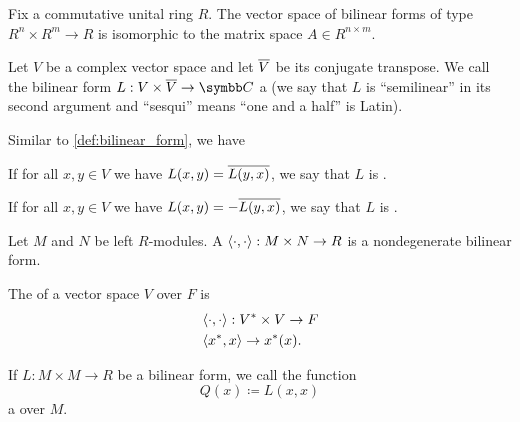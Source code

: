 \begin{corollary}\label{thm:bilinear_forms_isomorphic_to_matrices}
  Fix a commutative unital ring \( R \). The vector space of bilinear forms of type \( R^n \times R^m \to R \) is isomorphic to the matrix space \( A \in R^{n \times m} \).
\end{corollary}

\begin{definition}\label{def:sesquilinear_form}\cite[258]{Knapp2016BAlg}
  Let \( V \) be a complex vector space and let \( \overline{V} \) be its conjugate transpose. We call the bilinear form \( L: V \times \Ol V \to \Co \) a  (we say that \( L \) is \enquote{semilinear} in its second argument and \enquote{sesqui} means \enquote{one and a half} is Latin).

  Similar to \cref{def:bilinear_form}, we have
  \begin{defenum}
     If for all \( x, y \in V \) we have \( L(x, y) = \overline{L(y, x)} \), we say that \( L \) is .

     If for all \( x, y \in V \) we have \( L(x, y) = -\overline{L(y, x)} \), we say that \( L \) is .
  \end{defenum}
\end{definition}

\begin{definition}\label{def:duality_pairing}
  Let \( M \) and \( N \) be left \( R \)-modules. A  \( \left\langle \cdot, \cdot \right\rangle: M \times N \to R \) is a nondegenerate bilinear form.

  The  of a vector space \( V \) over \( F \) is
  \begin{align*}
    &\left\langle \cdot, \cdot \right\rangle: V^* \times V \to F \\
    &\left\langle x^*, x \right\rangle \to x^*(x).
  \end{align*}
\end{definition}

\begin{definition}\label{def:quadratic_form}
  If \( L: M \times M \to R \) be a bilinear form, we call the function
  \begin{equation*}
    Q(x) \coloneqq L(x, x)
  \end{equation*}
  a  over \( M \).
\end{definition}

